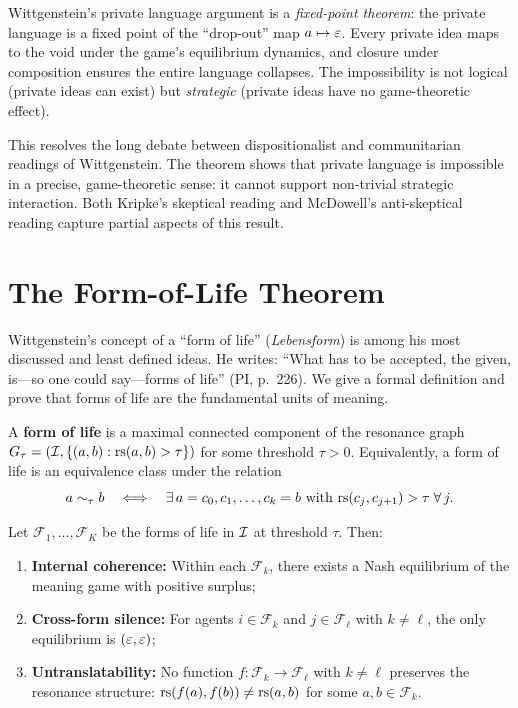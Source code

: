 \begin{interpretation}
Wittgenstein's private language argument is a \emph{fixed-point
theorem}: the private language is a fixed point of the
``drop-out'' map $a \mapsto \varepsilon$.  Every private idea maps
to the void under the game's equilibrium dynamics, and closure
under composition ensures the entire language collapses.
The impossibility is not logical (private ideas can exist)
but \emph{strategic} (private ideas have no game-theoretic
effect).

This resolves the long debate between dispositionalist and
communitarian readings of Wittgenstein.  The theorem shows
that private language is impossible in a precise, game-theoretic
sense: it cannot support non-trivial strategic interaction.
Both Kripke's skeptical reading and McDowell's anti-skeptical
reading capture partial aspects of this result.
\end{interpretation}

\section{The Form-of-Life Theorem}
\label{sec:form-of-life}

Wittgenstein's concept of a ``form of life'' (\textit{Lebensform})
is among his most discussed and least defined ideas.  He writes:
``What has to be accepted, the given, is---so one could say---forms
of life'' (PI, p.~226).  We give a formal definition and prove
that forms of life are the fundamental units of meaning.

\begin{definition}
\label{def:form-of-life-synthesis}
A \textbf{form of life} is a maximal connected component of
the resonance graph $G_\tau = (\mathcal{I}, \{(a,b) : \mathrm{rs}(a,b) > \tau\})$
for some threshold $\tau > 0$.  Equivalently, a form of life is
an equivalence class under the relation
\[
  a \sim_\tau b \quad\Longleftrightarrow\quad
  \exists\, a = c_0, c_1, \ldots, c_k = b \text{ with }
  \mathrm{rs}(c_j, c_{j+1}) > \tau \;\forall\, j.
\]
\end{definition}

\begin{theorem}
\label{thm:form-of-life}
Let $\mathcal{F}_1, \ldots, \mathcal{F}_K$ be the forms of life
in $\mathcal{I}$ at threshold $\tau$.  Then:
\begin{enumerate}[label=(\roman*)]
  \item \textbf{Internal coherence:} Within each $\mathcal{F}_k$,
    there exists a Nash equilibrium of the meaning game with
    positive surplus;
  \item \textbf{Cross-form silence:} For agents $i \in \mathcal{F}_k$
    and $j \in \mathcal{F}_\ell$ with $k \ne \ell$, the only
    equilibrium is $(\varepsilon, \varepsilon)$;
  \item \textbf{Untranslatability:} No function $f \colon \mathcal{F}_k
    \to \mathcal{F}_\ell$ with $k \ne \ell$ preserves the
    resonance structure:
    $\mathrm{rs}(f(a), f(b)) \ne \mathrm{rs}(a,b)$ for some $a, b \in \mathcal{F}_k$.
\end{enumerate}
\end{theorem}


